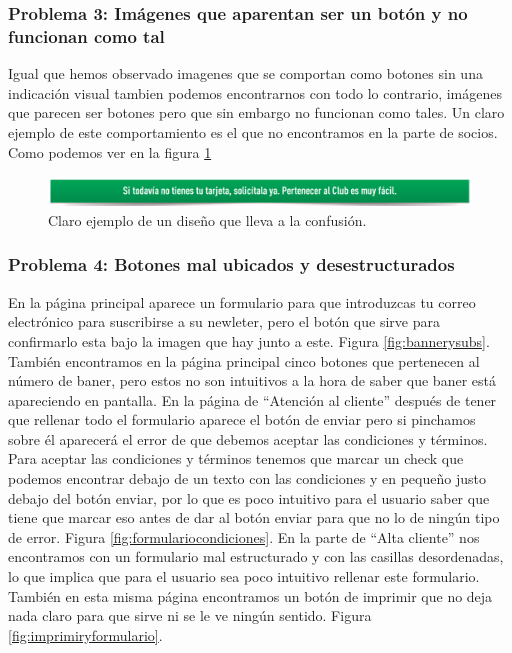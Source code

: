 \documentclass[a4paper,11pt]{article}
\begin{document}
\subsubsection{Problema 3: Imágenes que aparentan ser un botón y no funcionan como tal}
Igual que hemos observado imagenes que se comportan como botones sin una indicación visual tambien podemos encontrarnos con todo lo contrario, imágenes que parecen ser botones pero que sin embargo no funcionan como tales. Un claro ejemplo de este comportamiento es el que no encontramos en la parte de socios. Como podemos ver en la figura \ref{fig:botonnoboton}

\begin{figure}[h!]
 \centering
 \includegraphics[scale=0.4]{botonquenoesboton.png}
 \caption{Claro ejemplo de un diseño que lleva a la confusión.}
 \label{fig:botonnoboton}
\end{figure}


\subsubsection{Problema 4: Botones mal ubicados y desestructurados}
En la página principal aparece un formulario para que introduzcas tu correo electrónico para suscribirse a su newleter, pero el botón que sirve para confirmarlo esta bajo la imagen que hay junto a este. Figura \ref{fig:bannerysubs}.
También encontramos en la página principal cinco botones que pertenecen al número de baner, pero estos no son intuitivos a la hora de saber que baner está apareciendo en pantalla. En la página de “Atención al cliente” después de tener que rellenar todo el formulario aparece el botón de enviar pero si pinchamos sobre él aparecerá el error de que debemos aceptar las condiciones y términos. Para aceptar las condiciones y términos tenemos que marcar un check que podemos encontrar debajo de un texto con las condiciones y en pequeño justo debajo del botón enviar, por lo que es poco intuitivo para el usuario saber que tiene que marcar eso antes de dar al botón enviar para que no lo de ningún tipo de error. Figura \ref{fig:formulariocondiciones}.
En la parte de “Alta cliente” nos encontramos con un formulario mal estructurado y con las casillas desordenadas, lo que implica que para el usuario sea poco intuitivo rellenar este formulario. También en esta misma página encontramos un botón de imprimir que no deja nada claro para que sirve ni se le ve ningún sentido. Figura \ref{fig:imprimiryformulario}.
\end{document}
